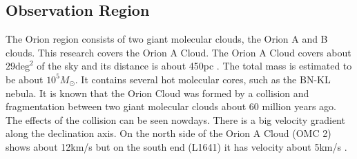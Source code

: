 \documentclass[twoside,11pt]{gshs_thesis}
\begin{document}
\subsection{Observation Region}
The Orion region consists of two giant molecular clouds, the Orion A and B clouds. This research covers the Orion A Cloud. The Orion A Cloud covers about $29 \textrm{deg}^2$ of the sky and its distance is about 450pc \cite{Oriondistance}. The total mass is estimated to be about $10^5 M_{\odot}$. It contains several hot molecular cores, such as the BN-KL nebula. It is known that the Orion Cloud was formed by a collision and fragmentation between two giant molecular clouds about 60 million years ago. The effects of the collision can be seen nowdays. There is a big velocity gradient along the declination axis. On the north side of the Orion A Cloud (OMC 2) shows about 12km/s but on the south end (L1641) it has velocity about 5km/s \cite{Schulz}.
\end{document}
